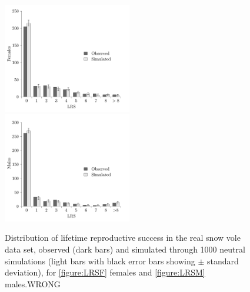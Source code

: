 \begin{figure}[ht]
				{
					\includegraphics[width=0.5\textwidth]{FiguresDynHet/Figure4a}
					\label{figure:LRSF}
				}
				{
					\includegraphics[width=0.5\textwidth]{FiguresDynHet/Figure4b}
					\label{figure:LRSM}
				}
\caption{ \footnotesize Distribution of lifetime reproductive success in the real snow vole data set, observed (dark bars) and simulated through 1000 neutral simulations (light bars with black error bars showing $\pm$ standard deviation), for \ref{figure:LRSF} females and \ref{figure:LRSM} males.WRONG}
				\label{figure:LRS}
\end{figure}

